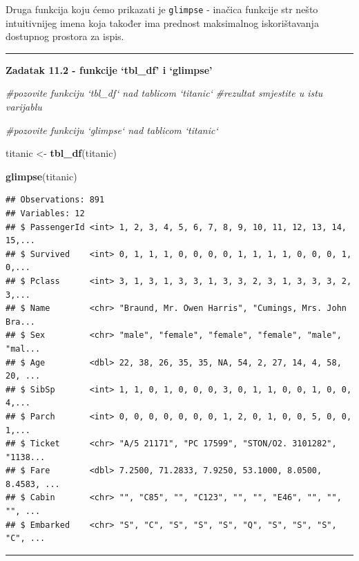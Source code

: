 \documentclass[]{book}
\newenvironment{Shaded}{\begin{snugshade}}{\end{snugshade}}
\newcommand{\KeywordTok}[1]{\textcolor[rgb]{0.13,0.29,0.53}{\textbf{#1}}}
\newcommand{\StringTok}[1]{\textcolor[rgb]{0.31,0.60,0.02}{#1}}
\newcommand{\CommentTok}[1]{\textcolor[rgb]{0.56,0.35,0.01}{\textit{#1}}}
\newcommand{\NormalTok}[1]{#1}
\theoremstyle{definition}
\theoremstyle{definition}
\theoremstyle{definition}
\theoremstyle{remark}
\begin{document}
Druga funkcija koju ćemo prikazati je \texttt{glimpse} - inačica
funkcije str nešto intuitivnijeg imena koja također ima prednost
maksimalnog iskorištavanja dostupnog prostora za ispis.

\begin{center}\rule{0.5\linewidth}{\linethickness}\end{center}

\textbf{Zadatak 11.2 - funkcije `tbl\_df' i `glimpse'}

\begin{Shaded}
\begin{Highlighting}[]
\CommentTok{#pozovite funkciju `tbl_df` nad tablicom `titanic`}
\CommentTok{#rezultat smjestite u istu varijablu}

\CommentTok{#pozovite funkciju `glimpse` nad tablicom `titanic`}
\end{Highlighting}
\end{Shaded}

\begin{Shaded}
\begin{Highlighting}[]
\NormalTok{titanic <-}\StringTok{ }\KeywordTok{tbl_df}\NormalTok{(titanic)}

\KeywordTok{glimpse}\NormalTok{(titanic)}
\end{Highlighting}
\end{Shaded}

\begin{verbatim}
## Observations: 891
## Variables: 12
## $ PassengerId <int> 1, 2, 3, 4, 5, 6, 7, 8, 9, 10, 11, 12, 13, 14, 15,...
## $ Survived    <int> 0, 1, 1, 1, 0, 0, 0, 0, 1, 1, 1, 1, 0, 0, 0, 1, 0,...
## $ Pclass      <int> 3, 1, 3, 1, 3, 3, 1, 3, 3, 2, 3, 1, 3, 3, 3, 2, 3,...
## $ Name        <chr> "Braund, Mr. Owen Harris", "Cumings, Mrs. John Bra...
## $ Sex         <chr> "male", "female", "female", "female", "male", "mal...
## $ Age         <dbl> 22, 38, 26, 35, 35, NA, 54, 2, 27, 14, 4, 58, 20, ...
## $ SibSp       <int> 1, 1, 0, 1, 0, 0, 0, 3, 0, 1, 1, 0, 0, 1, 0, 0, 4,...
## $ Parch       <int> 0, 0, 0, 0, 0, 0, 0, 1, 2, 0, 1, 0, 0, 5, 0, 0, 1,...
## $ Ticket      <chr> "A/5 21171", "PC 17599", "STON/O2. 3101282", "1138...
## $ Fare        <dbl> 7.2500, 71.2833, 7.9250, 53.1000, 8.0500, 8.4583, ...
## $ Cabin       <chr> "", "C85", "", "C123", "", "", "E46", "", "", "", ...
## $ Embarked    <chr> "S", "C", "S", "S", "S", "Q", "S", "S", "S", "C", ...
\end{verbatim}

\begin{center}\rule{0.5\linewidth}{\linethickness}\end{center}
\end{document}
